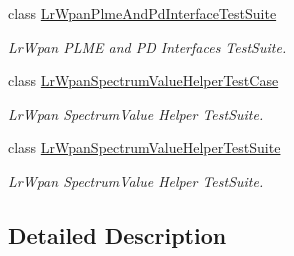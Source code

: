 \begin{DoxyCompactItemize}
class \hyperlink{classLrWpanPlmeAndPdInterfaceTestSuite}{Lr\+Wpan\+Plme\+And\+Pd\+Interface\+Test\+Suite}
\begin{DoxyCompactList}\small\item\em Lr\+Wpan P\+L\+ME and PD Interfaces Test\+Suite. \end{DoxyCompactList}\item 
class \hyperlink{classLrWpanSpectrumValueHelperTestCase}{Lr\+Wpan\+Spectrum\+Value\+Helper\+Test\+Case}
\begin{DoxyCompactList}\small\item\em Lr\+Wpan Spectrum\+Value Helper Test\+Suite. \end{DoxyCompactList}\item 
class \hyperlink{classLrWpanSpectrumValueHelperTestSuite}{Lr\+Wpan\+Spectrum\+Value\+Helper\+Test\+Suite}
\begin{DoxyCompactList}\small\item\em Lr\+Wpan Spectrum\+Value Helper Test\+Suite. \end{DoxyCompactList}\end{DoxyCompactItemize}


\subsection{Detailed Description}
